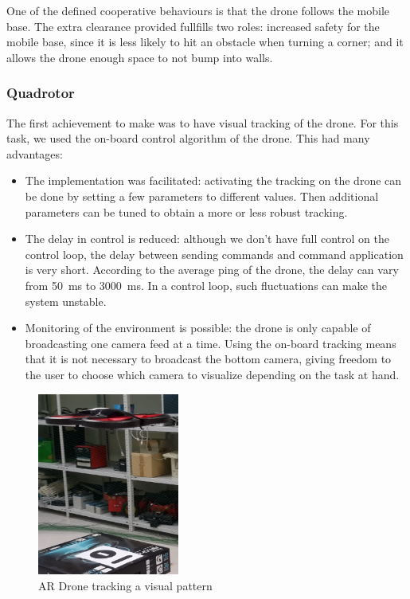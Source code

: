 \documentclass[11pt,a4paper,twocolumn]{article}
\begin{document}
One of the defined cooperative behaviours is that the drone follows the mobile base.  The extra clearance provided fullfills two roles: increased safety for the mobile base, since it is less likely to hit an obstacle when turning a corner; and it allows the drone enough space to not bump into walls. 


\subsubsection{Quadrotor}
The first achievement to make was to have visual tracking of the drone. For this task, we used 
the on-board control algorithm of the drone. This had many advantages: 
\begin{itemize}
\item The implementation was facilitated: activating the tracking on the drone can be done by 
setting a few parameters to different values. Then additional parameters can be tuned to
obtain a more or less robust tracking.

\item The delay in control is reduced: although we don't have full control on the control
loop, the delay between sending commands and command application is very short. According to
the average ping of the drone, the delay can vary from 50~ms to 3000~ms. In a control loop,
such fluctuations can make the system unstable.

\item Monitoring of the environment is possible: the drone is only capable of broadcasting one camera feed at a time. Using the on-board tracking means that it is not necessary to broadcast the bottom camera, giving freedom to the user to choose which camera to visualize depending on the task at hand.

\end{itemize}


\begin{figure}[ht]
	\centering
    \includegraphics[height=6cm]{visualTracking.png}
    \caption{AR Drone tracking a visual pattern}
    \label{fig:visualTracking}
\end{figure}
\end{document}

